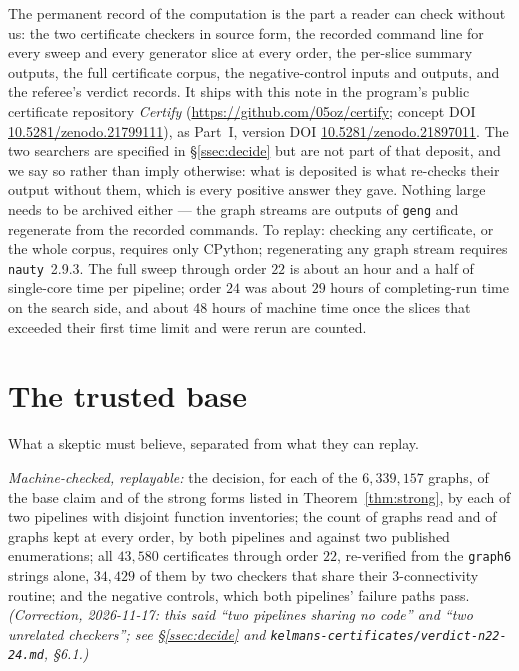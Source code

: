 \documentclass[11pt]{amsart}
\theoremstyle{plain}
\theoremstyle{definition}
\theoremstyle{remark}
\begin{document}
The permanent record of the computation is the part a reader can check
without us: the two certificate checkers in source form, the recorded
command line for every sweep and every generator slice at every order,
the per-slice summary outputs, the full certificate corpus, the
negative-control inputs and outputs, and the referee's verdict records.
It ships with this note in the program's public certificate repository
\emph{Certify} (\url{https://github.com/05oz/certify}; concept DOI
\href{https://doi.org/10.5281/zenodo.21799111}{10.5281/zenodo.21799111}),
as Part~I, version DOI
\href{https://doi.org/10.5281/zenodo.21897011}{10.5281/zenodo.21897011}.
The two searchers are specified in \S\ref{ssec:decide} but are not part
of that deposit, and we say so rather than imply otherwise: what is
deposited is what re-checks their output without them, which is every
positive answer they gave. Nothing large needs to be archived either --- the
graph streams are outputs of \texttt{geng} and regenerate from the
recorded commands. To replay: checking any certificate, or the whole
corpus, requires only CPython; regenerating any graph stream requires
\texttt{nauty}~2.9.3. The full sweep through order $22$ is about an hour
and a half of single-core time per pipeline; order $24$ was about $29$
hours of completing-run time on the search side, and about $48$ hours of
machine time once the slices that exceeded their first time limit and
were rerun are counted.

\section{The trusted base}\label{sec:tcb}

What a skeptic must believe, separated from what they can replay.

\emph{Machine-checked, replayable:} the decision, for each of the
$6{,}339{,}157$ graphs, of the base claim and of the strong forms listed
in Theorem~\ref{thm:strong}, by each of two pipelines with disjoint
function inventories; the count of graphs read and of graphs kept at every
order, by both pipelines and against two published enumerations; all
$43{,}580$ certificates through order $22$, re-verified from the
\texttt{graph6} strings alone, $34{,}429$ of them by two checkers that
share their $3$-connectivity routine; and the negative controls, which both
pipelines' failure paths pass. \emph{(Correction, 2026-11-17: this said
``two pipelines sharing no code'' and ``two unrelated checkers''; see
\S\ref{ssec:decide} and \texttt{kelmans-certificates/verdict-n22-24.md},
\S6.1.)}
\end{document}
